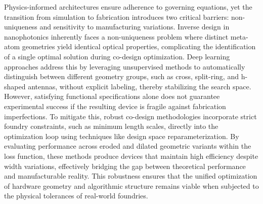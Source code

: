 \documentclass[11pt]{article}
\begin{document}
Physics-informed architectures ensure adherence to governing equations, yet the transition from simulation to fabrication introduces two critical barriers: non-uniqueness and sensitivity to manufacturing variations. Inverse design in nanophotonics inherently faces a non-uniqueness problem where distinct meta-atom geometries yield identical optical properties, complicating the identification of a single optimal solution during co-design optimization. Deep learning approaches address this by leveraging unsupervised methods to automatically distinguish between different geometry groups, such as cross, split-ring, and h-shaped antennas, without explicit labeling, thereby stabilizing the search space. However, satisfying functional specifications alone does not guarantee experimental success if the resulting device is fragile against fabrication imperfections. To mitigate this, robust co-design methodologies incorporate strict foundry constraints, such as minimum length scales, directly into the optimization loop using techniques like design space reparameterization. \citep{doi_10_1021_acsphotonics_2c00313_0d7d39c3} By evaluating performance across eroded and dilated geometric variants within the loss function, these methods produce devices that maintain high efficiency despite width variations, effectively bridging the gap between theoretical performance and manufacturable reality. This robustness ensures that the unified optimization of hardware geometry and algorithmic structure remains viable when subjected to the physical tolerances of real-world foundries. \citep{doi_10_1515_nanoph_2019_0474_d2187501} \citep{doi_10_1021_acsphotonics_0c01202_d9ad1299} \citep{doi_10_1021_acsphotonics_2c00313_0d7d39c3}
\end{document}
